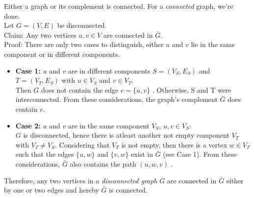 \documentclass[a4paper]{article}
\begin{document}
	\begin{solution}{3}
		\begin{theorem}{Either a graph or its complement is connected.}
			For a \emph{connected} graph, we're done.\\
			
			
			Let $G = (V, E)$ be disconnected. \\
			Claim: Any two vertices $u,v \in V$ are connected in $\bar{G}$. \\
			Proof: There are only two cases to distinguish, either $u$ and $v$ lie in the same component or in different components. 
			\begin{itemize}
				\item  \textbf{Case 1: } $u$ and $v$ are in different components $S = (V_S, E_S)$ and $T = (V_T, E_S)$ with $u \in V_S$ and $v \in V_T$.\\
				Then $G$ does not contain the edge $e = \{u, v\}$ . Otherwise, S and T were interconnected. From these considerations, the graph's complement $\bar{G}$ does contain $e$.
				\item \textbf{Case 2: } $u$ and $v$ are in the same component $V_S$, $u, v \in V_S$:\\
					$G$ is disconnected, hence there is atleast another not empty component $V_T$ with $V_T \neq V_S$. 
					Considering that $V_T$ is not empty, then there is a vertex $w \in V_T$ such that the edges $\{u, w\}$ and $\{v, w\}$ exist in $\bar{G}$ (see Case 1). From these considerations, $\bar{G}$ also contains the path $(u, w, v)$ .
			\end{itemize}
			
			Therefore, any two vertices in a \emph{disconnected graph} $G$ are connected in $\bar{G}$ either by one or two edges and hereby $\bar{G}$ is connected.\\
		\end{theorem}
	\end{solution} 
\end{document}
